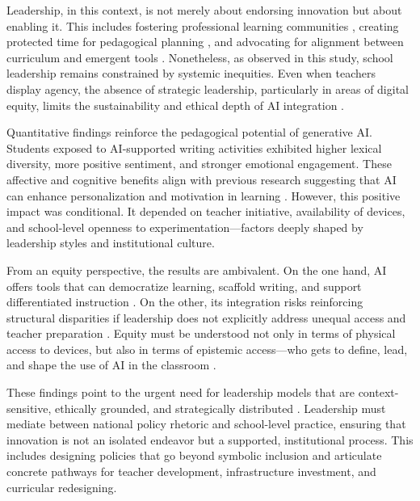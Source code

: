 \documentclass[english]{textolivre}
\begin{document}
Leadership, in this context, is not merely about endorsing innovation but about enabling it. This includes fostering professional learning communities \cite{poekert2023leading}, creating protected time for pedagogical planning \cite{swaffield2020leadership}, and advocating for alignment between curriculum and emergent tools \cite{fullan2020leading,nicolae2018leadership}. Nonetheless, as observed in this study, school leadership remains constrained by systemic inequities. Even when teachers display agency, the absence of strategic leadership, particularly in areas of digital equity, limits the sustainability and ethical depth of AI integration \cite{ng2023teachers,greco2024digital}.

Quantitative findings reinforce the pedagogical potential of generative AI. Students exposed to AI-supported writing activities exhibited higher lexical diversity, more positive sentiment, and stronger emotional engagement. These affective and cognitive benefits align with previous research suggesting that AI can enhance personalization and motivation in learning \cite{chookaew2024fostering,mohlake2023leadership}. However, this positive impact was conditional. It depended on teacher initiative, availability of devices, and school-level openness to experimentation—factors deeply shaped by leadership styles and institutional culture.

From an equity perspective, the results are ambivalent. On the one hand, AI offers tools that can democratize learning, scaffold writing, and support differentiated instruction \cite{wang2024factors,dakakni2023artificial}. On the other, its integration risks reinforcing structural disparities if leadership does not explicitly address unequal access and teacher preparation \cite{unesco2021reimagining,mcgrath2023responsibility}. Equity must be understood not only in terms of physical access to devices, but also in terms of epistemic access—who gets to define, lead, and shape the use of AI in the classroom \cite{knox2023repoliticising,roshanaei2024towards}.

These findings point to the urgent need for leadership models that are context-sensitive, ethically grounded, and strategically distributed \cite{heifetz2009practice,harris2014distributed}. Leadership must mediate between national policy rhetoric and school-level practice, ensuring that innovation is not an isolated endeavor but a supported, institutional process. This includes designing policies that go beyond symbolic inclusion and articulate concrete pathways for teacher development, infrastructure investment, and curricular redesigning.
\end{document}
